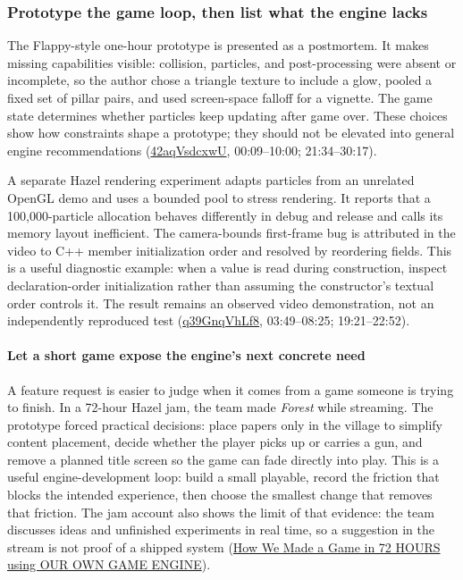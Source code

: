 \subsubsection{Prototype the game loop, then list what the engine lacks}\label{prototype-the-game-loop-then-list-what-the-engine-lacks}

The Flappy-style one-hour prototype is presented as a postmortem. It makes missing capabilities visible: collision, particles, and post-processing were absent or incomplete, so the author chose a triangle texture to include a glow, pooled a fixed set of pillar pairs, and used screen-space falloff for a vignette. The game state determines whether particles keep updating after game over. These choices show how constraints shape a prototype; they should not be elevated into general engine recommendations (\href{https://www.youtube.com/watch?v=42aqVsdcxwU}{42aqVsdcxwU}, 00:09--10:00; 21:34--30:17).

A separate Hazel rendering experiment adapts particles from an unrelated OpenGL demo and uses a bounded pool to stress rendering. It reports that a 100,000-particle allocation behaves differently in debug and release and calls its memory layout inefficient. The camera-bounds first-frame bug is attributed in the video to C++ member initialization order and resolved by reordering fields. This is a useful diagnostic example: when a value is read during construction, inspect declaration-order initialization rather than assuming the constructor's textual order controls it. The result remains an observed video demonstration, not an independently reproduced test (\href{https://www.youtube.com/watch?v=q39GnqVhLf8}{q39GnqVhLf8}, 03:49--08:25; 19:21--22:52).

\paragraph{Let a short game expose the engine's next concrete need}\label{let-a-short-game-expose-the-engines-next-concrete-need}

A feature request is easier to judge when it comes from a game someone is trying to finish. In a 72-hour Hazel jam, the team made \emph{Forest} while streaming. The prototype forced practical decisions: place papers only in the village to simplify content placement, decide whether the player picks up or carries a gun, and remove a planned title screen so the game can fade directly into play. This is a useful engine-development loop: build a small playable, record the friction that blocks the intended experience, then choose the smallest change that removes that friction. The jam account also shows the limit of that evidence: the team discusses ideas and unfinished experiments in real time, so a suggestion in the stream is not proof of a shipped system (\href{https://www.youtube.com/watch?v=tQ_pjZDfm-0&t=0m1s}{How We Made a Game in 72 HOURS using OUR OWN GAME ENGINE}).

